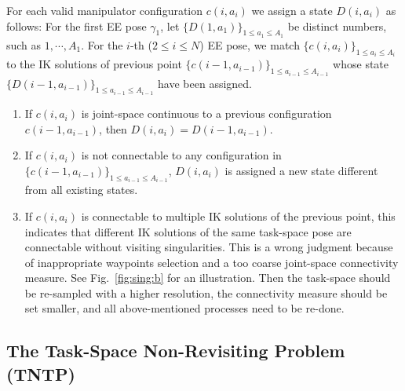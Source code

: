\documentclass[letterpaper, 10 pt, journal, twoside]{ieeetran}  %
\begin{document}
For each valid manipulator configuration $c(i, a_i)$ we assign a state $D(i, a_i)$ as follows: 
For the first EE pose $\gamma_1$, let $\{D(1, a_1)\}_{1\leq a_1\leq A_1}$ be distinct numbers, such as $1, \cdots, A_1$. 
For the $i$-th ($2\leq i\leq N$) EE pose, we match $\{c(i, a_i)\}_{1\leq a_i\leq A_i}$ to the IK solutions of previous point $\{c(i-1, a_{i-1})\}_{1\leq a_{i-1}\leq A_{i-1}}$ whose state $\{D(i-1, a_{i-1})\}_{1\leq a_{i-1}\leq A_{i-1}}$ have been assigned. 
\begin{enumerate}
\item If $c(i, a_i)$ is joint-space continuous to a previous configuration $c(i-1, a_{i-1})$, then $D(i, a_i) = D(i-1, a_{i-1})$.
\item If $c(i, a_i)$ is not connectable to any configuration in $\{c(i-1, a_{i-1})\}_{1\leq a_{i-1}\leq A_{i-1}}$,  $D(i, a_i)$ is assigned a new state different from all existing states. 
\item If $c(i, a_i)$ is connectable to multiple IK solutions of the previous point, this indicates that different IK solutions of the same task-space pose are connectable without visiting singularities. This is a wrong judgment because of inappropriate waypoints selection and a too coarse joint-space connectivity measure. See Fig.~\ref{fig:sing:b} for an illustration. Then the task-space should be re-sampled with a higher resolution, the connectivity measure should be set smaller, and all above-mentioned processes need to be re-done. 
\end{enumerate}


\subsection{The Task-Space Non-Revisiting Problem (TNTP)}
\end{document}
